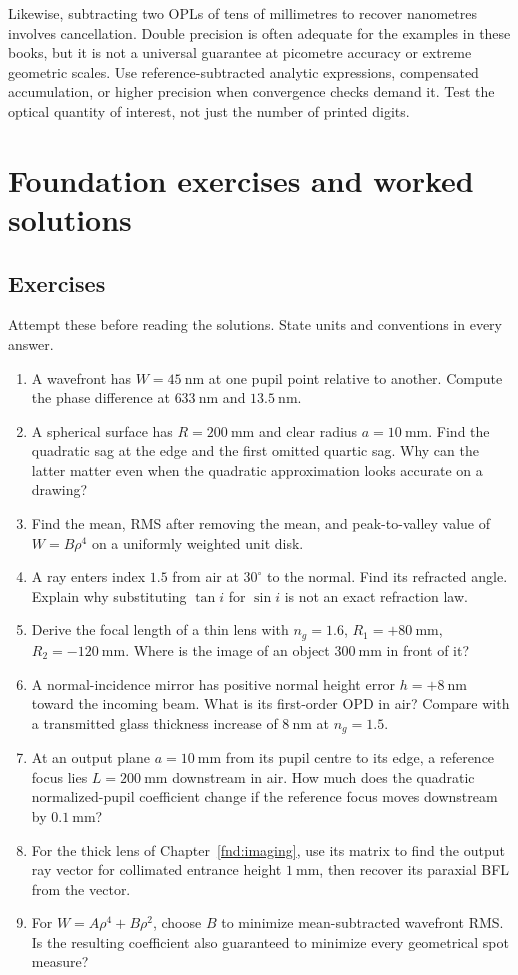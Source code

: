 Likewise, subtracting two OPLs of tens of millimetres to recover nanometres involves cancellation. Double precision is often adequate for the examples in these books, but it is not a universal guarantee at picometre accuracy or extreme geometric scales. Use reference-subtracted analytic expressions, compensated accumulation, or higher precision when convergence checks demand it. Test the optical quantity of interest, not just the number of printed digits.

\chapter{Foundation exercises and worked solutions}
\label{fnd:exercises}
\section{Exercises}
Attempt these before reading the solutions. State units and conventions in every answer.
\begin{enumerate}
\item A wavefront has $W=45\ \mathrm{nm}$ at one pupil point relative to another. Compute the phase difference at $633\ \mathrm{nm}$ and $13.5\ \mathrm{nm}$.
\item A spherical surface has $R=200\ \mathrm{mm}$ and clear radius $a=10\ \mathrm{mm}$. Find the quadratic sag at the edge and the first omitted quartic sag. Why can the latter matter even when the quadratic approximation looks accurate on a drawing?
\item Find the mean, RMS after removing the mean, and peak-to-valley value of $W=B\rho^4$ on a uniformly weighted unit disk.
\item A ray enters index $1.5$ from air at $30^\circ$ to the normal. Find its refracted angle. Explain why substituting $\tan i$ for $\sin i$ is not an exact refraction law.
\item Derive the focal length of a thin lens with $n_g=1.6$, $R_1=+80\ \mathrm{mm}$, $R_2=-120\ \mathrm{mm}$. Where is the image of an object $300\ \mathrm{mm}$ in front of it?
\item A normal-incidence mirror has positive normal height error $h=+8\ \mathrm{nm}$ toward the incoming beam. What is its first-order OPD in air? Compare with a transmitted glass thickness increase of $8\ \mathrm{nm}$ at $n_g=1.5$.
\item At an output plane $a=10\ \mathrm{mm}$ from its pupil centre to its edge, a reference focus lies $L=200\ \mathrm{mm}$ downstream in air. How much does the quadratic normalized-pupil coefficient change if the reference focus moves downstream by $0.1\ \mathrm{mm}$?
\item For the thick lens of Chapter~\ref{fnd:imaging}, use its matrix to find the output ray vector for collimated entrance height $1\ \mathrm{mm}$, then recover its paraxial BFL from the vector.
\item For $W=A\rho^4+B\rho^2$, choose $B$ to minimize mean-subtracted wavefront RMS. Is the resulting coefficient also guaranteed to minimize every geometrical spot measure?
\end{enumerate}

